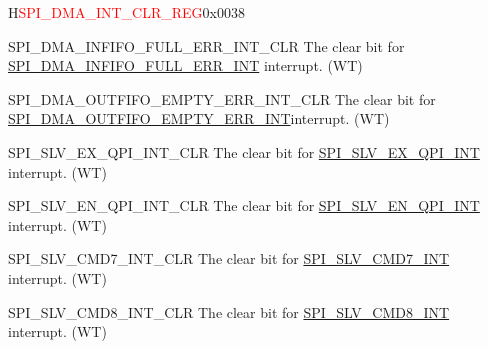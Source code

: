 \begin{register}{H}{\textcolor{red}{SPI\_DMA\_INT\_CLR\_REG}}{0x{}0038}\label{regdesc:SPIDMAINTCLRREG}
%
%
%
%
%
%
%
%
%
%
%
%
%
%
%
%
%
%
%
%
%
%
\regnewline%
\begin{regdesc}\begin{reglist}
\label{fielddesc:SPIDMAINFIFOFULLERRINTCLR}\item [SPI\_DMA\_INFIFO\_FULL\_ERR\_INT\_CLR] The clear bit for \hyperref[int:SPIINFIFOFULLERRINT]{SPI\_DMA\_INFIFO\_FULL\_ERR\_INT} interrupt. (WT)
\label{fielddesc:SPIDMAOUTFIFOEMPTYERRINTCLR}\item [SPI\_DMA\_OUTFIFO\_EMPTY\_ERR\_INT\_CLR] The clear bit for \hyperref[int:SPIOUTFIFOEMPTYERRINT]{SPI\_DMA\_OUTFIFO\_EMPTY\_ERR\_INT}interrupt. (WT)
\label{fielddesc:SPISLVEXQPIINTCLR}\item [SPI\_SLV\_EX\_QPI\_INT\_CLR] The clear bit for \hyperref[int:SPISLVEXQPIINT]{SPI\_SLV\_EX\_QPI\_INT} interrupt. (WT)
\label{fielddesc:SPISLVENQPIINTCLR}\item [SPI\_SLV\_EN\_QPI\_INT\_CLR] The clear bit for \hyperref[int:SPISLVENQPIINT]{SPI\_SLV\_EN\_QPI\_INT} interrupt. (WT)
\label{fielddesc:SPISLVCMD7INTCLR}\item [SPI\_SLV\_CMD7\_INT\_CLR] The clear bit for \hyperref[int:SPISLVCMD7INT]{SPI\_SLV\_CMD7\_INT} interrupt. (WT)
\label{fielddesc:SPISLVCMD8INTCLR}\item [SPI\_SLV\_CMD8\_INT\_CLR] The clear bit for \hyperref[int:SPISLVCMD8INT]{SPI\_SLV\_CMD8\_INT} interrupt. (WT)

\end{reglist}
\end{regdesc}
\end{register}
